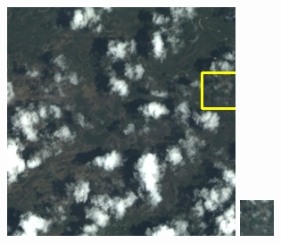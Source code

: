 \documentclass[UTF8]{ctexart}
\begin{document}
\begin{figure}[H]
{\begin{minipage}[b]{0.15\linewidth}
            \includegraphics[width=1\linewidth]{../log/cut/LC80980712014024LGN00_14882_color.jpg}\vspace{4pt}
            \includegraphics[width=1\linewidth]{../log/cut/tmp_cut_LC80980712014024LGN00_14882_color.jpg}

\end{minipage}}
\end{figure}
\end{document}

